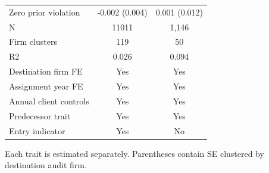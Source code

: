 \begin{table}[!htbp]
{\begin{tabular}{lcc}
Zero prior violation & -0.002 (0.004) & 0.001 (0.012) \\
N & 11011 & 1,146 \\
Firm clusters & 119 & 50 \\
R2 & 0.026 & 0.094 \\
Destination firm FE & Yes & Yes \\
Assignment year FE & Yes & Yes \\
Annual client controls & Yes & Yes \\
Predecessor trait & Yes & Yes \\
Entry indicator & Yes & No \\
\bottomrule
\end{tabular}}
\begin{minipage}{\textwidth}\footnotesize Each trait is estimated separately. Parentheses contain SE clustered by destination audit firm.\end{minipage}
\end{table}
